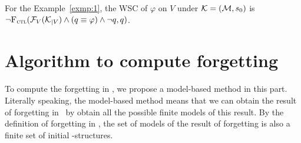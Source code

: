 \documentclass{article}
\begin{document}
%
%

\begin{example}
For the Example~\ref{exmp:1}, the WSC of $\varphi$ on $V$ under ${\cal K} =({\cal M}, s_0)$ is $\neg {\textsc{F}_{\textsc{ctl}}}({\cal F}_{V}({\cal K}_{|V}) \wedge (q \equiv \varphi) \wedge \neg q, q)$.
\end{example}


\section{Algorithm to compute forgetting}
To compute the forgetting in \CTL, we propose a model-based method in this part.
Literally speaking, the model-based method means that we can obtain the result of forgetting in \CTL\ by obtain all the possible finite models of this result.
By the definition of forgetting in \CTL, the set of models of the result of forgetting is also a finite set of initial \MPK-structures.
%
%
\end{document}
